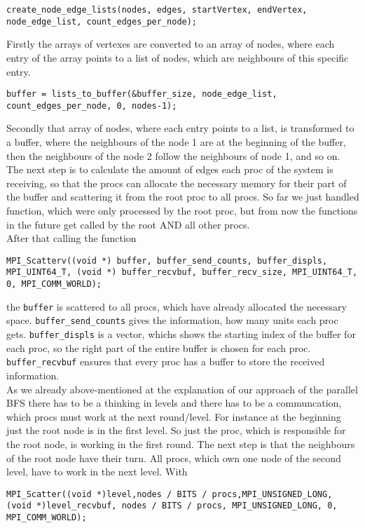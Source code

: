 \documentclass[11pt,a4paper]{article}
\begin{document}
\begin{lstlisting}
create_node_edge_lists(nodes, edges, startVertex, endVertex, node_edge_list, count_edges_per_node);
\end{lstlisting}
Firstly the arrays of vertexes are converted to an array of nodes, where each entry of the array points to a list of nodes, which are neighbours of this specific entry.
\begin{lstlisting}
buffer = lists_to_buffer(&buffer_size, node_edge_list, count_edges_per_node, 0, nodes-1);
\end{lstlisting}
Secondly that array of nodes, where each entry points to a list, is transformed to a buffer, where the neighbours of the node 1 are at the beginning of the buffer, then the neighbours of the node 2 follow the neighbours of node 1, and so on.
The next step is to calculate the amount of edges each proc of the system is receiving, so that the procs can allocate the necessary memory for their part of the buffer and scattering it from the root proc to all procs.  So far we just handled function, which were only processed by the root proc, but from now the functions in the future get called by the root AND all other procs. \\
After that calling the function
\begin{lstlisting}
MPI_Scatterv((void *) buffer, buffer_send_counts, buffer_displs, MPI_UINT64_T, (void *) buffer_recvbuf, buffer_recv_size, MPI_UINT64_T, 0, MPI_COMM_WORLD);
\end{lstlisting}
the \lstinline{buffer} is scattered to all procs, which have already allocated the necessary space. \lstinline{buffer_send_counts} gives the information, how many units each proc gets. \lstinline{buffer_displs} is a vector, whichs shows the starting index of the buffer for each proc, so the right part of the entire buffer is chosen for each proc. \lstinline{buffer_recvbuf} ensures that every proc has a buffer to store the received information.\\
As we already above-mentioned at the explanation of our approach of the parallel BFS there has to be a thinking in levels and there has to be a communcation, which procs must work at the next round/level. For instance at the beginning just the root node is in the first level. So just the proc, which is responsible for the root node, is working in the first round. The next step is that the neighbours of the root node have their turn. All procs, which own one node of the second level, have to work in the next level. With
\begin{lstlisting}
MPI_Scatter((void *)level,nodes / BITS / procs,MPI_UNSIGNED_LONG, (void *)level_recvbuf, nodes / BITS / procs, MPI_UNSIGNED_LONG, 0, MPI_COMM_WORLD);
\end{lstlisting}
\end{document}
